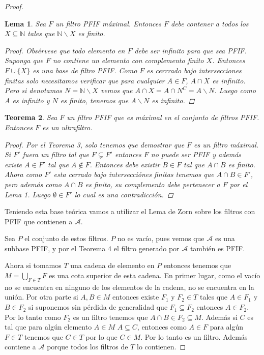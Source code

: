 \documentclass[letter,twoside,12pt]{article}
\newtheorem{theo}{Teorema}
\newtheorem{lemma}[theo]{Lema}
\begin{document}
\begin{enumerate}
\begin{proof}
\begin{lemma}
Sea $ F $ un filtro PFIF máximal. Entonces $ F $ debe contener a todos los $ X \subseteq \mathbb{N} $ tales que $ \mathbb{N}\backslash X $ es finito.
\begin{proof}
Obsérvese que todo elemento en $ F $ debe ser infinito para que sea PFIF. Suponga que $ F $ no contiene un elemento con complemento finito $ X $. Entonces $ F \cup \{X\} $ es una base de filtro PFIF. Como $ F $ es cerrrado bajo intersecciones finitas solo necesitamos verificar que para cualquier $ A \in F $, $ A \cap X $ es infinito. Pero si denotamos $ N = \mathbb{N}\backslash X $ vemos que $ A \cap X = A \cap N^C = A \backslash N$. Luego como $ A $ es infinito y $ N $ es finito, tenemos que $ A \backslash N $ es infinito.
\end{proof} 
\end{lemma}

\begin{theo}
Sea $ F $ un filtro PFIF que es máximal en el conjunto de filtros PFIF. Entonces $ F $ es un ultrafiltro.
\begin{proof}
Por el Teorema 3, solo tenemos que demostrar que $ F $ es un filtro máximal. Si $ F' $ fuera un filtro tal que $ F \subsetneq F' $ entonces  $ F $ no puede ser PFIF y además existe $ A \in F' $ tal que $ A \not \in F $. Entonces debe existir $ B \in F $ tal que $ A \cap B $ es finito. Ahora como $ F' $ esta cerrado bajo intersecciónes finitas tenemos que $ A \cap B \in F' $, pero además como $ A \cap B $ es finito, su complemento debe pertenecer a $ F $ por el Lema 1. Luego $ \emptyset \in F' $ lo cual es una contradicción.  
\end{proof}
\end{theo}

Teniendo esta base teórica vamos a utilizar el Lema de Zorn sobre los filtros con PFIF que contienen a $ \mathcal{A} $.

Sea $ P $ el conjunto de estos filtros. $ P $ no es vacío, pues vemos que $ \mathcal{A} $ es una subbase PFIF, y por el Teorema 4 el filtro generado por $ \mathcal{A} $ también es PFIF.

Ahora si tomamos $ T $ una cadena de elemento en $ P $ entonces tenemos que $M = \bigcup_{F \in T} F $ es una cota superior de esta cadena. En primer lugar, como el vacío no se encuentra en ninguno de los elementos de la cadena, no se encuentra en la unión. Por otra parte si $ A, B \in M $ entonces existe $ F_1 $ y $ F_2  \in T$ tales que $ A \in F_1 $ y $ B \in F_2 $ si suponemos sin pérdida de generalidad que $ F_1 \subseteq F_2 $ entonces $ A \in F_2 $. Por lo tanto como $ F_2 $ es un filtro tenemos que $ A \cap B \in F_2 \subseteq M$. Además si $C$ es tal que para algún elemento $ A \in M $ $ A \subseteq C $, entonces como $ A \in F $ para algún $ F \in T $ tenemos que $ C \in T $ por lo que $ C \in M $. Por lo tanto es un filtro. Además contiene  a $ \mathcal{A} $ porque todos los filtros de $ T $ lo contienen.


\end{proof}
\end{enumerate}
\end{document}

